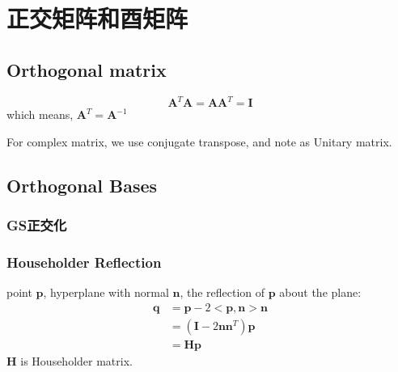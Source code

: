 \documentclass[UTF8]{../../09-Mathematics}
\begin{document}
\chapter{正交矩阵和酉矩阵}


\section{Orthogonal matrix}

$$
\boldsymbol{A}^T\boldsymbol{A} = \boldsymbol{A}\boldsymbol{A} ^T = \boldsymbol{I}
$$
which means, $\boldsymbol{A}^T = \boldsymbol{A} ^{-1}$

For complex matrix, we use conjugate transpose, and note as Unitary matrix.


\section{Orthogonal Bases}

\subsection{GS正交化}




\subsection{Householder Reflection}

point $\boldsymbol p$, hyperplane with normal  $\boldsymbol n$, the reflection of  $\boldsymbol p$ about the plane:
$$
\begin{aligned}
    \boldsymbol q &= \boldsymbol p - 2<\boldsymbol p ,\boldsymbol n >\boldsymbol n \\
    &= (\boldsymbol I -2\boldsymbol n \boldsymbol n^T )\boldsymbol p\\
    &= \boldsymbol H \boldsymbol p
\end{aligned}
$$
$\boldsymbol H$ is Householder matrix.
\end{document}
